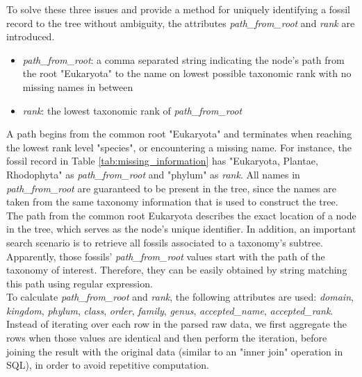 \documentclass[11pt, a4paper,oneside,chapterprefix=false]{scrbook}
\begin{document}
To solve these three issues and provide a method for uniquely identifying a fossil record to the tree without ambiguity, the attributes \emph{path\_from\_root} and \emph{rank} are introduced. 

\begin{itemize}
	\item \textit{path\_from\_root}: a comma separated string indicating the node's path from the root "Eukaryota" to the name on lowest possible taxonomic rank with no missing names in between
	\item \textit{rank}: the lowest taxonomic rank of \textit{path\_from\_root}
\end{itemize}

A path begins from the common root "Eukaryota" and terminates when reaching the lowest rank level "species", or encountering a missing name. For instance, the fossil record in Table \ref{tab:missing_information} has "Eukaryota, Plantae, Rhodophyta" as \emph{path\_from\_root} and "phylum" as \emph{rank}. All names in \emph{path\_from\_root} are guaranteed to be present in the tree, since the names are taken from the same taxonomy information that is used to construct the tree. The path from the common root Eukaryota describes the exact location of a node in the tree, which serves as the node's unique identifier. In addition, an important search scenario is to retrieve all fossils associated to a taxonomy's subtree. Apparently, those fossils' \emph{path\_from\_root} values start with the path of the taxonomy of interest. Therefore, they can be easily obtained by string matching this path using regular expression. \\

To calculate \emph{path\_from\_root} and \emph{rank}, the following attributes are used:  \emph{domain}, \emph{kingdom}, \emph{phylum}, \emph{class}, \emph{order}, \emph{family}, \emph{genus}, \emph{accepted\_name}, \emph{accepted\_rank}. Instead of iterating over each row in the parsed raw data, we first aggregate the rows when those values are identical and then perform the iteration, before joining the result with the original data (similar to an "inner join" operation in SQL), in order to avoid repetitive computation. \\
\end{document}
